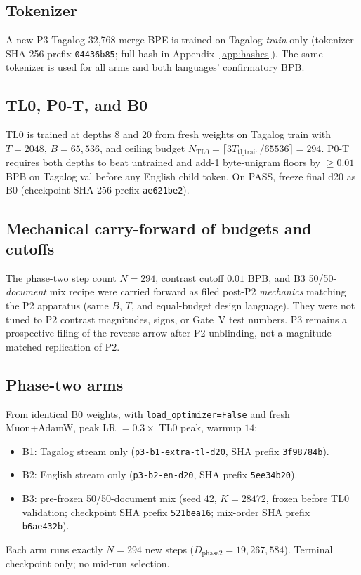 \documentclass[11pt,a4paper]{article}
\begin{document}
\subsection{Tokenizer}
A new P3 Tagalog 32{,}768-merge BPE is trained on Tagalog \emph{train} only (tokenizer SHA-256 prefix \texttt{04436b85}; full hash in Appendix~\ref{app:hashes}). The same tokenizer is used for all arms and both languages' confirmatory BPB.

\subsection{TL0, P0-T, and B0}
TL0 is trained at depths 8 and 20 from fresh weights on Tagalog train with $T=2048$, $B=65{,}536$, and ceiling budget $N_{\mathrm{TL0}}=\lceil 3T_{\mathrm{tl\_train}}/65536\rceil=294$. P0-T requires both depths to beat untrained and add-1 byte-unigram floors by $\ge 0.01$ BPB on Tagalog val before any English child token. On PASS, freeze final d20 as B0 (checkpoint SHA-256 prefix \texttt{ae621be2}).

\subsection{Mechanical carry-forward of budgets and cutoffs}
The phase-two step count $N=294$, contrast cutoff $0.01$ BPB, and B3 50/50-\emph{document} mix recipe were carried forward as filed post-P2 \emph{mechanics} matching the P2 apparatus (same $B$, $T$, and equal-budget design language). They were not tuned to P2 contrast magnitudes, signs, or Gate~V test numbers. P3 remains a prospective filing of the reverse arrow after P2 unblinding, not a magnitude-matched replication of P2.

\subsection{Phase-two arms}
From identical B0 weights, with \texttt{load\_optimizer=False} and fresh Muon+AdamW, peak LR $=0.3\times$ TL0 peak, warmup $14$:
\begin{itemize}
\item B1: Tagalog stream only (\texttt{p3-b1-extra-tl-d20}, SHA prefix \texttt{3f98784b}).
\item B2: English stream only (\texttt{p3-b2-en-d20}, SHA prefix \texttt{5ee34b20}).
\item B3: pre-frozen 50/50-document mix (seed 42, $K=28472$, frozen before TL0 validation; checkpoint SHA prefix \texttt{521bea16}; mix-order SHA prefix \texttt{b6ae432b}).
\end{itemize}
Each arm runs exactly $N=294$ new steps ($D_{\mathrm{phase2}}=19{,}267{,}584$). Terminal checkpoint only; no mid-run selection.
\end{document}

